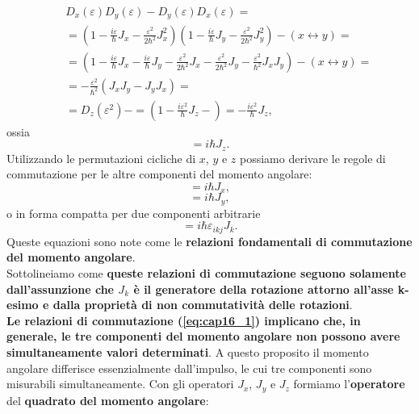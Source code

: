 \begin{eqnarray}
& &D_x (\varepsilon)D_y (\varepsilon)-D_y (\varepsilon)D_x (\varepsilon)= \nonumber\\
& & = \left(1-\frac{i\varepsilon}{\hbar} J_x -\frac{\varepsilon ^2}{2\hbar ^2}J_x ^2\right)\left(1-\frac{i\varepsilon}{\hbar} J_y -\frac{\varepsilon ^2}{2\hbar ^2}J_y ^2\right)- \left( x \leftrightarrow y\right) =\nonumber \\
& &= \left(1-\frac{i\varepsilon}{\hbar} J_x-\frac{i\varepsilon}{\hbar} J_y-\frac{\varepsilon ^2}{2\hbar ^2}J_x-\frac{\varepsilon ^2}{2\hbar ^2}J_y-\frac{\varepsilon ^2}{\hbar ^2}J_xJ_y \right) - \left( x \leftrightarrow y\right) = \nonumber \\
& & = -\frac{\varepsilon ^2}{\hbar ^2}\left(J_xJ_y-J_y J_x\right)= \nonumber \\
& & = D_z (\varepsilon ^2)- = \left(1-\frac{i\varepsilon ^2}{\hbar} J_z-\right)=-\frac{i\varepsilon ^2}{\hbar} J_z, 
\end{eqnarray}
ossia
\begin{equation}
[ J_x, J_y ] = i\hbar J_z.
\end{equation}
Utilizzando le permutazioni cicliche di $x$, $y$ e $z$ possiamo derivare le regole di commutazione per le altre componenti del momento angolare:
\begin{equation}
[ J_y, J_z ] = i\hbar J_x,
\end{equation}
\begin{equation}
[ J_z, J_x ] = i\hbar J_y,
\end{equation}
o in forma compatta per due componenti arbitrarie
\begin{equation}
[ J_i, J_j ] = i\hbar \varepsilon _{ikj}J_k.
\label{eq:cap16_1}
\end{equation}
Queste equazioni sono note come le \textbf{relazioni fondamentali di commutazione del momento angolare}.\\
Sottolineiamo come \textbf{queste relazioni di commutazione seguono solamente dall'assunzione che $J_k$ è il generatore della rotazione attorno all'asse k-esimo e dalla proprietà di non commutatività delle rotazioni}.\\
\textbf{Le relazioni di commutazione (\ref{eq:cap16_1}) implicano che, in generale, le tre componenti del momento angolare non possono avere simultaneamente valori determinati}. A questo proposito il momento angolare differisce essenzialmente dall'impulso, le cui tre componenti sono misurabili simultaneamente.		
Con gli operatori $J_x$, $J_y$ e $J_z$ formiamo l'\textbf{operatore} del \textbf{quadrato del momento angolare}:
